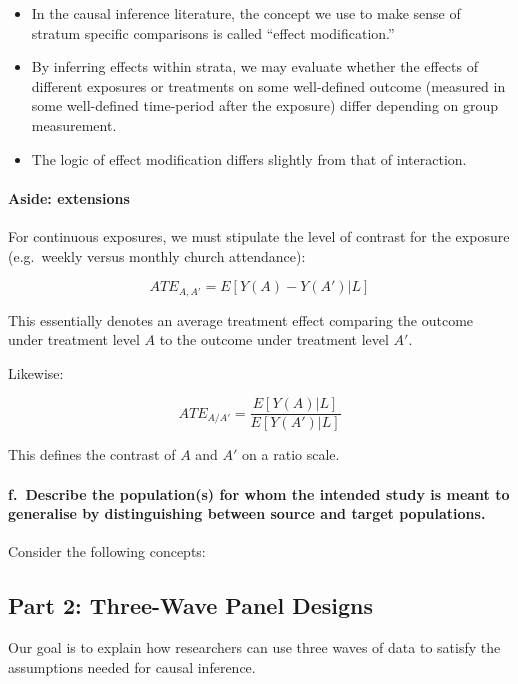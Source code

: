 \documentclass[
  singlecolumn]{article}
\let\oldparagraph\paragraph
\renewcommand{\paragraph}[1]{\oldparagraph{#1}\mbox{}}
\providecommand{\tightlist}{%
  \setlength{\itemsep}{0pt}\setlength{\parskip}{0pt}}\usepackage{longtable,booktabs,array}
\begin{document}
\begin{itemize}
\tightlist
\item
  In the causal inference literature, the concept we use to make sense
  of stratum specific comparisons is called ``effect modification.''
\item
  By inferring effects within strata, we may evaluate whether the
  effects of different exposures or treatments on some well-defined
  outcome (measured in some well-defined time-period after the exposure)
  differ depending on group measurement.
\item
  The logic of effect modification differs slightly from that of
  interaction.
\end{itemize}

\paragraph{Aside: extensions}\label{aside-extensions}

For continuous exposures, we must stipulate the level of contrast for
the exposure (e.g.~weekly versus monthly church attendance):

\[ATE_{A,A'} = E[Y(A) - Y(A')| L]\]

This essentially denotes an average treatment effect comparing the
outcome under treatment level \(A\) to the outcome under treatment level
\(A'\).

Likewise:

\[ATE_{A/A'} = \frac{E[Y(A)| L]}{E[Y(A')| L]}\]

This defines the contrast of \(A\) and \(A'\) on a ratio scale.

\paragraph{f.~Describe the population(s) for whom the intended study is
meant to generalise by distinguishing between source and target
populations.}\label{f.-describe-the-populations-for-whom-the-intended-study-is-meant-to-generalise-by-distinguishing-between-source-and-target-populations.}

Consider the following concepts:

\subsection{Part 2: Three-Wave Panel
Designs}\label{part-2-three-wave-panel-designs}

Our goal is to explain how researchers can use three waves of data to
satisfy the assumptions needed for causal inference.
\end{document}
